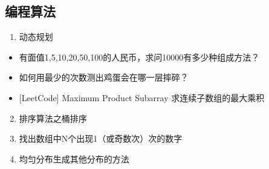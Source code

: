 \documentclass[letterpaper,10pt,english]{sphinxmanual}
\begin{document}
\subsection{编程算法}
\label{\detokenize{else/02_interview:id3}}\begin{enumerate}
\item {} 
动态规划

\end{enumerate}
\begin{itemize}
\item {} 
有面值1,5,10,20,50,100的人民币，求问10000有多少种组成方法？
\begin{quote}

\end{quote}

\item {} 
如何用最少的次数测出鸡蛋会在哪一层摔碎？
\begin{quote}

\end{quote}

\item {} 
{[}LeetCode{]} Maximum Product Subarray 求连续子数组的最大乘积
\begin{quote}

\end{quote}

\end{itemize}
\begin{enumerate}
\setcounter{enumi}{1}
\item {} 
排序算法之桶排序

\end{enumerate}
\begin{quote}

\end{quote}
\begin{enumerate}
\setcounter{enumi}{2}
\item {} 
找出数组中N个出现1（或奇数次）次的数字

\end{enumerate}
\begin{quote}

\end{quote}
\begin{enumerate}
\setcounter{enumi}{3}
\item {} 
均匀分布生成其他分布的方法

\end{enumerate}
\end{document}
